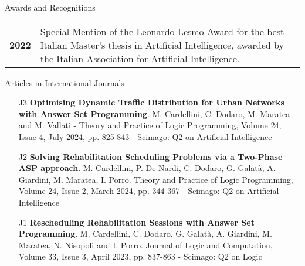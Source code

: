 \documentclass{resume} %
\begin{document}
 \begin{rSection}{Awards and Recognitions}
 \begin{tabularx}{0.95\textwidth} {lp{14cm}}

\textbf{2022}  & Special Mention of the Leonardo Lesmo Award for the best Italian Master’s thesis in Artificial Intelligence, awarded by the Italian Association for Artificial Intelligence. 
  \end{tabularx}
\end{rSection}

\begin{rSection}{Articles in International Journals}
\begin{enumerate}[leftmargin=5mm]
	\item[J3] \textbf{Optimising Dynamic Traffic Distribution for Urban Networks with Answer Set Programming}. M. Cardellini, C. Dodaro, M. Maratea and M. Vallati - Theory and Practice of Logic Programming,  Volume 24, Issue 4, July 2024, pp. 825-843 - Scimago: Q2 on Artificial Intelligence
	\item[J2] \textbf{Solving Rehabilitation Scheduling Problems via a Two-Phase ASP approach}. M. Cardellini, P. De Nardi, C. Dodaro, G. Galat\`a, A. Giardini, M. Maratea, I. Porro. Theory and Practice of Logic Programming, Volume 24, Issue 2, March 2024, pp. 344-367 - Scimago: Q2 on Artificial Intelligence
	\item[J1] \textbf{Rescheduling Rehabilitation Sessions with Answer Set Programming}. M. Cardellini, C. Dodaro, G. Galat\`a, A. Giardini, M. Maratea, N. Nisopoli and I. Porro. Journal of Logic and Computation, Volume 33, Issue 3, April 2023, pp. 837-863 - Scimago: Q2 on Logic
\end{enumerate}
\end{rSection}
 
\end{document}
